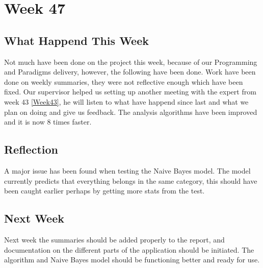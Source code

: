 \section*{Week 47}
\subsection*{What Happend This Week}
Not much have been done on the project this week, because of our Programming
and Paradigms delivery, however, the following have been done.
Work have been done on weekly summaries, they were not reflective enough which
have been fixed.
Our supervisor helped us setting up another meeting with the expert from week 43
\ref{Week43}, he will listen to what have happend since last and what we plan on
doing and give us feedback. The analysis algorithms have been improved and it is
now 8 times faster.

\subsection*{Reflection}
A major issue has been found when testing the Naive Bayes model. The model
currently predicts that everything belongs in the same category, this should
have been caught earlier perhaps by getting more stats from the test. 

\subsection*{Next Week}
Next week the summaries should be added properly to the report, and
documentation on the different parts of the application should be initiated. The
algorithm and Naive Bayes model should be functioning better and ready for use.


% 
% 
% 
